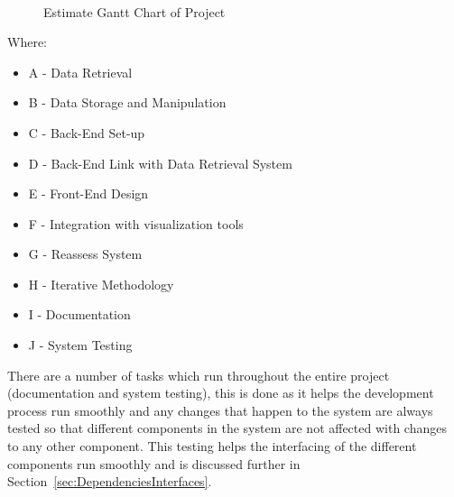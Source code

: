 \documentclass[12pt,onecolumn]{IEEEtran}
\begin{document}
\begin{center}
    \begin{figure}[htb]
        \centering
        \begin{ganttchart}{1}{30}
             \\
             \\
             \\
             \\
             \\
             \\
             \\
             \\
             \\
             \\    
             \\
        \end{ganttchart}
        \caption{Estimate Gantt Chart of Project}
        \label{fig:gantt}
    \end{figure}
\end{center}    
Where: 
\begin{itemize}
    \item A - Data Retrieval
    \item B - Data Storage and Manipulation
    \item C - Back-End Set-up
    \item D - Back-End Link with Data Retrieval System
    \item E - Front-End Design
    \item F - Integration with visualization tools
    \item G - Reassess System
    \item H - Iterative Methodology
    \item I - Documentation
    \item J - System Testing
\end{itemize}

There are a number of tasks which run throughout the entire project (documentation and system testing), this is done as it helps the development process run smoothly and any changes that happen to the system are always tested so that different components in the system are not affected with changes to any other component. This testing helps the interfacing of the different components run smoothly and is discussed further in Section~\ref{sec:DependenciesInterfaces}.
\end{document}
